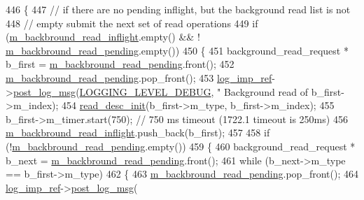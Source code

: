 \begin{DoxyCode}
446 \{
447     \textcolor{comment}{// if there are no pending inflight, but the background read list is not}
448     \textcolor{comment}{// empty submit the next set of read operations}
449     \textcolor{keywordflow}{if} (\hyperlink{classavdecc__lib_1_1end__station__imp_adc3620b385a00867b72dbfbcf6c839db}{m\_backbround\_read\_inflight}.empty() && !
      \hyperlink{classavdecc__lib_1_1end__station__imp_af2ab09d6e9373db122f0646f7a9e1eb9}{m\_backbround\_read\_pending}.empty())
450     \{
451         background\_read\_request * b\_first = \hyperlink{classavdecc__lib_1_1end__station__imp_af2ab09d6e9373db122f0646f7a9e1eb9}{m\_backbround\_read\_pending}.front();
452         \hyperlink{classavdecc__lib_1_1end__station__imp_af2ab09d6e9373db122f0646f7a9e1eb9}{m\_backbround\_read\_pending}.pop\_front();
453         \hyperlink{namespaceavdecc__lib_acbe3e2a96ae6524943ca532c87a28529}{log\_imp\_ref}->\hyperlink{classavdecc__lib_1_1log_a68139a6297697e4ccebf36ccfd02e44a}{post\_log\_msg}(\hyperlink{namespaceavdecc__lib_a501055c431e6872ef46f252ad13f85cdae3138c2a0a71a6404155ff912e450406}{LOGGING\_LEVEL\_DEBUG}, \textcolor{stringliteral}{"
      Background read of %
      b\_first->m\_index);
454         \hyperlink{classavdecc__lib_1_1end__station__imp_a6f1d8190a18143551c01f029cc554a50}{read\_desc\_init}(b\_first->m\_type, b\_first->m\_index);
455         b\_first->m\_timer.start(750); \textcolor{comment}{// 750 ms timeout (1722.1 timeout is 250ms)}
456         \hyperlink{classavdecc__lib_1_1end__station__imp_adc3620b385a00867b72dbfbcf6c839db}{m\_backbround\_read\_inflight}.push\_back(b\_first);
457 
458         \textcolor{keywordflow}{if} (!\hyperlink{classavdecc__lib_1_1end__station__imp_af2ab09d6e9373db122f0646f7a9e1eb9}{m\_backbround\_read\_pending}.empty())
459         \{
460             background\_read\_request * b\_next = \hyperlink{classavdecc__lib_1_1end__station__imp_af2ab09d6e9373db122f0646f7a9e1eb9}{m\_backbround\_read\_pending}.front();
461             \textcolor{keywordflow}{while} (b\_next->m\_type == b\_first->m\_type)
462             \{
463                 \hyperlink{classavdecc__lib_1_1end__station__imp_af2ab09d6e9373db122f0646f7a9e1eb9}{m\_backbround\_read\_pending}.pop\_front();
464                 \hyperlink{namespaceavdecc__lib_acbe3e2a96ae6524943ca532c87a28529}{log\_imp\_ref}->\hyperlink{classavdecc__lib_1_1log_a68139a6297697e4ccebf36ccfd02e44a}{post\_log\_msg}(
}
\end{DoxyCode}
